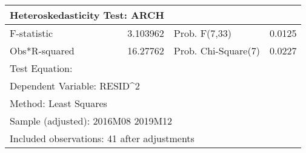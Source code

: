 \begin{tabular}{lrrrr}
\toprule
\multicolumn{2}{l}{Heteroskedasticity Test: ARCH}&\multicolumn{1}{c}{}&\multicolumn{1}{c}{}&\multicolumn{1}{c}{}\\
 \midrule 
\multicolumn{1}{l}{F-statistic}&\multicolumn{1}{r}{3.103962}&\multicolumn{2}{l}{Prob. F(7,33)}&\multicolumn{1}{r}{0.0125}\\
\multicolumn{1}{l}{Obs*R-squared}&\multicolumn{1}{r}{16.27762}&\multicolumn{2}{l}{Prob. Chi-Square(7)}&\multicolumn{1}{r}{0.0227}\\
 \midrule 
\multicolumn{1}{l}{Test Equation:}&\multicolumn{1}{c}{}&\multicolumn{1}{c}{}&\multicolumn{1}{c}{}&\multicolumn{1}{c}{}\\
\multicolumn{2}{l}{Dependent Variable: RESID\textasciicircum 2}&\multicolumn{1}{c}{}&\multicolumn{1}{c}{}&\multicolumn{1}{c}{}\\
\multicolumn{2}{l}{Method: Least Squares}&\multicolumn{1}{c}{}&\multicolumn{1}{c}{}&\multicolumn{1}{c}{}\\
\multicolumn{3}{l}{Sample (adjusted): 2016M08 2019M12}&\multicolumn{1}{c}{}&\multicolumn{1}{c}{}\\
\multicolumn{4}{l}{Included observations: 41 after adjustments}&\multicolumn{1}{c}{}\\
 \bottomrule 
\end{tabular}
